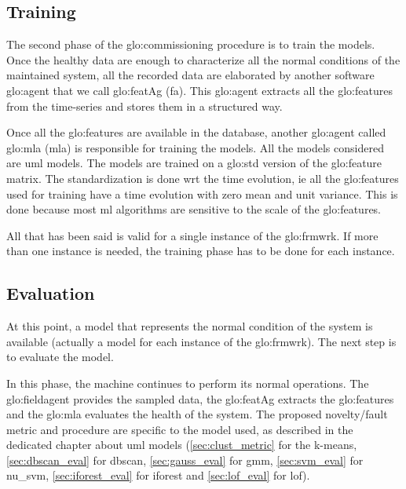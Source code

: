 \subsection{Training}
The second phase of the \gls{glo:commissioning} procedure is to train the models. Once the healthy data are enough to characterize all the normal conditions of the maintained system, all the recorded data are elaborated by another software \gls{glo:agent} that we call \gls{glo:featAg} (\gls{fa}). This \gls{glo:agent} extracts all the \gls{glo:feature}s from the time-series and stores them in a structured way.

Once all the \gls{glo:feature}s are available in the database, another \gls{glo:agent} called \gls{glo:mla} (\gls{mla}) is responsible for training the models. All the models considered are \gls{uml} models. The models are trained on a \gls{glo:std} version of the \gls{glo:feature} matrix. The standardization is done \gls{wrt} the time evolution, \gls{ie} all the \gls{glo:feature}s used for training have a time evolution with zero mean and unit variance. This is done because most \gls{ml} algorithms are sensitive to the scale of the \gls{glo:feature}s.

All that has been said is valid for a single instance of the \gls{glo:frmwrk}. If more than one instance is needed, the training phase has to be done for each instance.

\subsection{Evaluation}
At this point, a model that represents the normal condition of the system is available (actually a model for each instance of the \gls{glo:frmwrk}). The next step is to evaluate the model.

In this phase, the machine continues to perform its normal operations. The \gls{glo:fieldagent} provides the sampled data, the \gls{glo:featAg} extracts the \gls{glo:feature}s and the \gls{glo:mla} evaluates the health of the system.
The proposed novelty/fault metric and procedure are specific to the model used, as described in the dedicated chapter about \gls{uml} models (\autoref{sec:clust_metric} for the k-means, \autoref{sec:dbscan_eval} for \gls{dbscan}, \autoref{sec:gauss_eval} for \gls{gmm}, \autoref{sec:svm_eval} for \gls{nu_svm}, \autoref{sec:iforest_eval} for \gls{iforest} and \autoref{sec:lof_eval} for \gls{lof}). 

